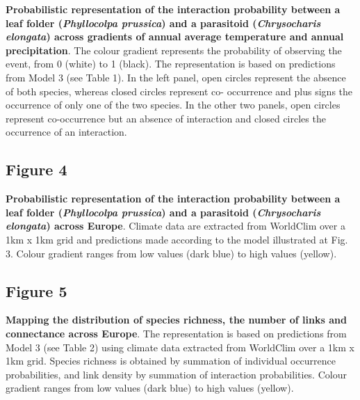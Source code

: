 \documentclass[12pt]{article}
\begin{document}
\textbf{Probabilistic representation of the interaction probability between a
leaf folder (\textit{Phyllocolpa prussica}) and a parasitoid
(\textit{Chrysocharis elongata}) across gradients of annual average
temperature and annual precipitation}. The colour gradient represents the
probability of observing the event, from 0 (white) to 1 (black). The
representation is based on predictions from Model 3 (see Table 1). In the left
panel, open circles represent the absence of both species, whereas closed
circles represent co- occurrence and plus signs the occurrence of only one of
the two species. In the other two panels, open circles represent co-occurrence
but an absence of interaction and closed circles the occurrence of an
interaction.

\subsection*{Figure 4}

\textbf{Probabilistic representation of the interaction probability between a
leaf folder (\textit{Phyllocolpa prussica}) and a parasitoid
(\textit{Chrysocharis elongata}) across Europe}. Climate data are extracted
from WorldClim over a 1km x 1km grid and predictions made according to the
model illustrated at Fig. 3. Colour gradient ranges from low values (dark
blue) to high values (yellow).



\subsection*{Figure 5}

\textbf{Mapping the distribution of species richness, the number of links and
connectance across Europe}. The representation is based on predictions from
Model 3 (see Table 2) using climate data extracted from WorldClim over a 1km x 1km grid. Species richness is obtained by summation of individual
occurrence probabilities, and link density by summation of interaction
probabilities. Colour gradient ranges from low values (dark blue) to high
values (yellow).
\end{document}
